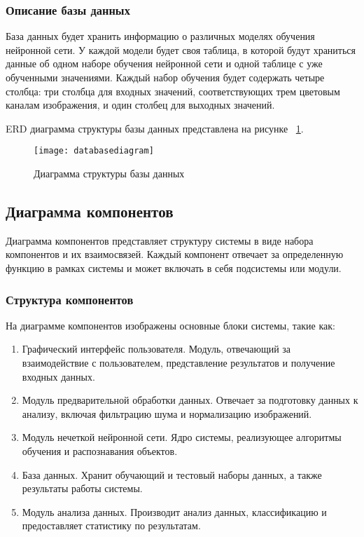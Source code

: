 \subsubsection{Описание базы данных}

База данных будет хранить информацию о различных моделях обучения нейронной сети. У каждой модели будет своя таблица, в которой будут храниться данные об одном наборе обучения нейронной сети и одной таблице с уже обученными значениями. Каждый набор обучения будет содержать четыре столбца: три столбца для входных значений, соответствующих трем цветовым каналам изображения, и один столбец для выходных значений.

ERD диаграмма структуры базы данных представлена на рисунке ~\ref{databasediagram:image}.

\begin{figure}[ht]
\texttt{[image: databasediagram]}
\caption{Диаграмма структуры базы данных}
\label{databasediagram:image}
\end{figure}

\subsection{Диаграмма компонентов}

Диаграмма компонентов представляет структуру системы в виде набора компонентов и их взаимосвязей. Каждый компонент отвечает за определенную функцию в рамках системы и может включать в себя подсистемы или модули.

\subsubsection{Структура компонентов}
На диаграмме компонентов изображены основные блоки системы, такие как:

\begin{enumerate}
\item Графический интерфейс пользователя. Модуль, отвечающий за взаимодействие с пользователем, представление результатов и получение входных данных.
\item Модуль предварительной обработки данных. Отвечает за подготовку данных к анализу, включая фильтрацию шума и нормализацию изображений.
\item Модуль нечеткой нейронной сети. Ядро системы, реализующее алгоритмы обучения и распознавания объектов.
\item База данных. Хранит обучающий и тестовый наборы данных, а также результаты работы системы.
\item Модуль анализа данных. Производит анализ данных, классификацию и предоставляет статистику по результатам.
\end{enumerate}

